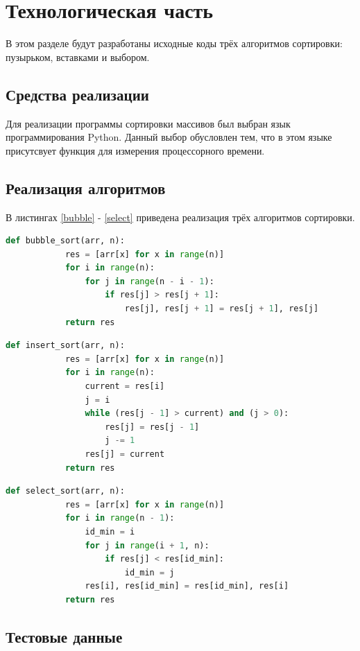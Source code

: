 \documentclass[12pt]{report}
\begin{document}
	\chapter{Технологическая часть}
	
	В этом разделе будут разработаны исходные коды трёх алгоритмов сортировки: пузырьком, вставками и выбором.
	
	\section{Средства реализации}
	Для реализации программы сортировки массивов был выбран язык программирования Python. Данный выбор обусловлен тем, что в этом языке присутсвует функция для измерения процессорного времени.
	
	\section{Реализация алгоритмов}
	
	В листингах \ref{bubble} - \ref{select} приведена реализация трёх алгоритмов сортировки.
	
	\begin{lstlisting}[label=bubble,caption=Функция сортировки пузырьком,language=Python]
		def bubble_sort(arr, n):
			res = [arr[x] for x in range(n)]
			for i in range(n):
				for j in range(n - i - 1):
					if res[j] > res[j + 1]:
						res[j], res[j + 1] = res[j + 1], res[j]
			return res
	\end{lstlisting}
	
	\begin{lstlisting}[label=insert,caption=Функция сортировки вставками,language=Python]
		def insert_sort(arr, n):
			res = [arr[x] for x in range(n)]
			for i in range(n):
				current = res[i]
				j = i
				while (res[j - 1] > current) and (j > 0):
					res[j] = res[j - 1]
					j -= 1
				res[j] = current
			return res
	\end{lstlisting}

	\newpage
	
	\begin{lstlisting}[label=select,caption=Функция сортировки выбором,language=Python]
		def select_sort(arr, n):
			res = [arr[x] for x in range(n)]
			for i in range(n - 1):
				id_min = i
				for j in range(i + 1, n):
					if res[j] < res[id_min]:
						id_min = j
				res[i], res[id_min] = res[id_min], res[i]
			return res
	\end{lstlisting}
	
	\section{Тестовые данные}
	
\end{document}
